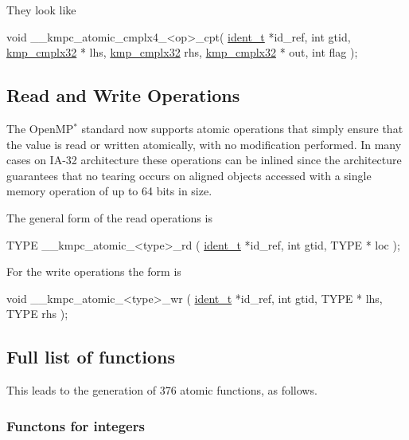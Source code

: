 They look like 
\begin{DoxyCode}
\textcolor{keywordtype}{void} \_\_kmpc\_atomic\_cmplx4\_<op>\_cpt(  \hyperlink{structident}{ident\_t} *id\_ref, \textcolor{keywordtype}{int} gtid, 
      \hyperlink{kmp__atomic_8h_ad8a8cb75fe83ea104b69764b8d14ece6}{kmp\_cmplx32} * lhs, \hyperlink{kmp__atomic_8h_ad8a8cb75fe83ea104b69764b8d14ece6}{kmp\_cmplx32} rhs, \hyperlink{kmp__atomic_8h_ad8a8cb75fe83ea104b69764b8d14ece6}{kmp\_cmplx32} * out, \textcolor{keywordtype}{int} flag );
\end{DoxyCode}


\subsection*{Read and Write Operations }

The Open\-M\-P$^{\mbox{$\ast$}}$  standard now supports atomic operations that simply ensure that the value is read or written atomically, with no modification performed. In many cases on I\-A-\/32 architecture these operations can be inlined since the architecture guarantees that no tearing occurs on aligned objects accessed with a single memory operation of up to 64 bits in size.

The general form of the read operations is 
\begin{DoxyCode}
TYPE \_\_kmpc\_atomic\_<type>\_rd ( \hyperlink{structident}{ident\_t} *id\_ref, \textcolor{keywordtype}{int} gtid, TYPE * loc );
\end{DoxyCode}


For the write operations the form is 
\begin{DoxyCode}
\textcolor{keywordtype}{void} \_\_kmpc\_atomic\_<type>\_wr ( \hyperlink{structident}{ident\_t} *id\_ref, \textcolor{keywordtype}{int} gtid, TYPE * lhs, TYPE rhs );
\end{DoxyCode}


\subsection*{Full list of functions }

This leads to the generation of 376 atomic functions, as follows.

\subsubsection*{Functons for integers }

